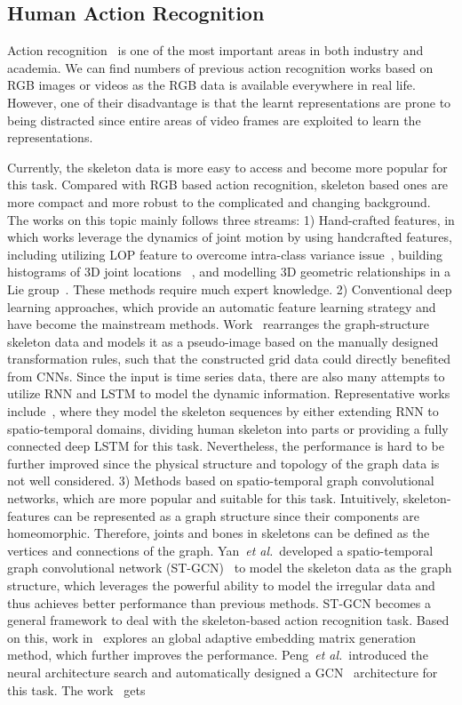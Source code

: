 \documentclass[letterpaper]{article} \usepackage{aaai19}  \usepackage{times}  \usepackage{helvet} \usepackage{courier}  \usepackage[hyphens]{url}  \usepackage{graphicx} \urlstyle{rm} \def\UrlFont{\rm}  \usepackage{graphicx}  \frenchspacing  \setlength{\pdfpagewidth}{8.5in}  \setlength{\pdfpageheight}{11in}
\def\etal{\emph{et al.}}
\begin{document}
\subsection{Human Action Recognition}
Action recognition~\cite{yan2018stgan,peng2019video,peng2020learning} is one of the most important areas in both industry and academia. We can find numbers of previous action recognition works based on RGB images or videos as the RGB data is available everywhere in real life. However, one of their disadvantage is that the learnt representations are prone to being distracted since entire areas of video frames are exploited to learn the representations. 

Currently, the skeleton data is more easy to access and become more popular for this task. Compared with RGB based action recognition, skeleton based ones are more compact and more robust to the complicated and changing background. The works on this topic mainly follows three streams: 1) Hand-crafted features, in which works leverage the dynamics of joint motion by using handcrafted features, including utilizing LOP feature to overcome intra-class variance issue~\cite{wang2012mining}, building histograms of 3D joint locations ~\cite{xia2012view}, and modelling 3D geometric relationships in a Lie group~\cite{vemulapalli2014human}. These methods require much expert knowledge. 2) Conventional deep learning approaches, which provide an automatic feature learning strategy and have become the mainstream methods. Work~\cite{kim2017interpretable} rearranges the graph-structure skeleton data and models it as a pseudo-image based on the manually designed transformation rules, such that the constructed grid data could directly benefited from CNNs. Since the input is time series data, there are also many attempts to utilize RNN and LSTM to model the dynamic information. Representative works include~\cite{du2015hierarchical,shahroudy2016ntu,song2017end,zhang2017view,si2018skeleton}, where they model the skeleton sequences by either extending RNN to spatio-temporal domains, dividing human skeleton into parts or providing a fully connected deep LSTM for this task. Nevertheless,  the performance is hard to be further improved since the physical structure and topology of the graph data is not well considered. 3) Methods based on spatio-temporal graph convolutional networks, which are more popular and suitable for this task. Intuitively, skeleton-features can be represented as a graph structure since their components are homeomorphic. Therefore, joints and bones in skeletons can be defined as the vertices and connections of the graph. Yan~\etal ~developed a spatio-temporal graph convolutional network (ST-GCN)~\cite{yan2018stgan} to model the skeleton data as the graph structure, which leverages the powerful ability to model the irregular data and thus achieves better performance than previous methods. ST-GCN becomes a general framework to deal with the skeleton-based action recognition task. Based on this, work in~\cite{shi2019two} explores an global adaptive embedding matrix generation method, which further improves the performance. Peng~\etal ~introduced the neural architecture search and automatically designed a GCN~\cite{peng2020learning} architecture for this task. The work~\cite{peng2020learning} gets 
\end{document}
